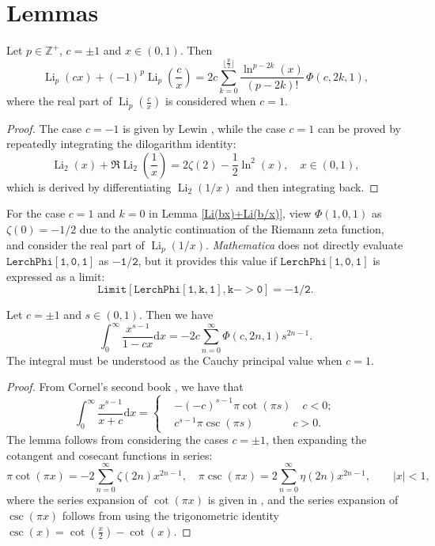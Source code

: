 \documentclass[11pt,reqno]{article}
\begin{document}
\section{Lemmas}
\begin{lemma}\label{Li(bx)+Li(b/x)}
	Let $p\in\mathbb{Z}^{+}$, $c=\pm 1$ and $x\in (0,1)$. Then
	\[\operatorname{Li}_{p}(cx)+{(-1)}^{p}\operatorname{Li}_{p}\left(\frac{c}{x}\right)=2c\sum_{k=0}^{\lfloor{\frac{p}{2}}\rfloor} \frac{\ln^{p-2k}(x)}{(p-2k)!}\,\Phi(c,2k,1),\]
	where the real part of $\operatorname{Li}_p(\frac{c}{x})$ is considered when $c=1$.
\end{lemma}
\begin{proof}
	The case $c=-1$ is given by Lewin \cite[p.192]{Lewin}, while the case $c=1$ can be proved by repeatedly integrating the dilogarithm identity:
	\[\operatorname{Li}_2(x)+\mathfrak{R}\operatorname{Li}_2\left(\frac{1}{x}\right)=2\zeta(2)-\frac12\ln^2(x),\quad x\in(0,1),\]
	which is derived by differentiating $\operatorname{Li}_2(1/x)$ and then integrating back. 
\end{proof}
\begin{remark}\label{first remark}
	For the case $c=1$ and $k=0$ in Lemma \ref{Li(bx)+Li(b/x)}, view $\Phi(1,0,1)$ as $\zeta(0)=-1/2$ due to the analytic continuation of the Riemann zeta function, and consider the real part of $\operatorname{Li}_{p}(1/x)$. \textit{Mathematica} does not directly evaluate $\mathtt{LerchPhi[1, 0, 1]}$ as $\mathtt{-1/2}$, but it provides this value if $\mathtt{LerchPhi[1, 0, 1]}$ is expressed as a limit: 
	\[\mathtt{Limit[LerchPhi[1, k, 1], {k-> 0}] = -1/2}.\]
\end{remark}
\begin{lemma}
	\label{x^(-s)}
	Let $c=\pm 1$ and $s\in(0,1)$. Then we have
	\[\int_0^\infty\frac{x^{s-1}}{1-cx}\mathrm{d} x=-2c\sum_{n=0}^\infty \Phi(c,2n,1) s^{2n-1}.\] 
	The integral must be understood as the Cauchy principal value when $c=1$.
\end{lemma}
\begin{proof}
	From Cornel's second book \cite[p.\,258]{book2}, we have that
	\begin{equation}\label{grad}
		\int_0^\infty\frac{x^{s-1}}{x+c}\mathrm{d} x=
		\begin{cases}
			& -(-c)^{s-1}\pi\cot(\pi s)\quad c<0;\\
			&  c^{s-1}\pi\csc(\pi s)\,\,\,\quad\qquad c>0.
		\end{cases}
	\end{equation}
	The lemma follows from considering the cases $c=\pm1$, then expanding  the cotangent and cosecant functions in series:
	\[	\pi \cot(\pi x)=-2\sum_{n=0}^\infty \zeta(2n) x^{2n-1},\quad\pi\csc(\pi x)=2\sum_{n=0}^\infty \eta(2n) x^{2n-1},\qquad |x|<1,\]
	where the series expansion of $\cot(\pi x)$ is given in \cite[p.\,29]{ali}, and the series expansion of $\csc(\pi x)$ follows from using the trigonometric identity $\csc(x)=\cot\left(\frac{x}{2}\right)-\cot(x)$.
\end{proof} 
\end{document}
